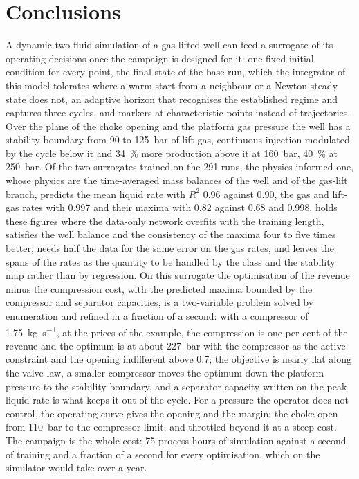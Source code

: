 \documentclass[a4paper,fleqn]{cas-sc}
\begin{document}
\section{Conclusions}\label{sec:conclusions}

A dynamic two-fluid simulation of a gas-lifted well can feed a surrogate of its operating decisions once the campaign is designed for it: one fixed initial condition for every point, the final state of the base run, which the integrator of this model tolerates where a warm start from a neighbour or a Newton steady state does not, an adaptive horizon that recognises the established regime and captures three cycles, and markers at characteristic points instead of trajectories. Over the plane of the choke opening and the platform gas pressure the well has a stability boundary from 90 to \SI{125}{\bar} of lift gas, continuous injection modulated by the cycle below it and \SI{34}{\percent} more production above it at \SI{160}{\bar}, \SI{40}{\percent} at \SI{250}{\bar}. Of the two surrogates trained on the 291 runs, the physics-informed one, whose physics are the time-averaged mass balances of the well and of the gas-lift branch, predicts the mean liquid rate with $R^2$ 0.96 against 0.90, the gas and lift-gas rates with 0.997 and their maxima with 0.82 against 0.68 and 0.998, holds these figures where the data-only network overfits with the training length, satisfies the well balance and the consistency of the maxima four to five times better, needs half the data for the same error on the gas rates, and leaves the spans of the rates as the quantity to be handled by the class and the stability map rather than by regression. On this surrogate the optimisation of the revenue minus the compression cost, with the predicted maxima bounded by the compressor and separator capacities, is a two-variable problem solved by enumeration and refined in a fraction of a second: with a compressor of \SI{1.75}{\kilogram\per\second}, at the prices of the example, the compression is one per cent of the revenue and the optimum is at about \SI{227}{\bar} with the compressor as the active constraint and the opening indifferent above 0.7; the objective is nearly flat along the valve law, a smaller compressor moves the optimum down the platform pressure to the stability boundary, and a separator capacity written on the peak liquid rate is what keeps it out of the cycle. For a pressure the operator does not control, the operating curve gives the opening and the margin: the choke open from \SI{110}{\bar} to the compressor limit, and throttled beyond it at a steep cost. The campaign is the whole cost: 75 process-hours of simulation against a second of training and a fraction of a second for every optimisation, which on the simulator would take over a year.
\end{document}

